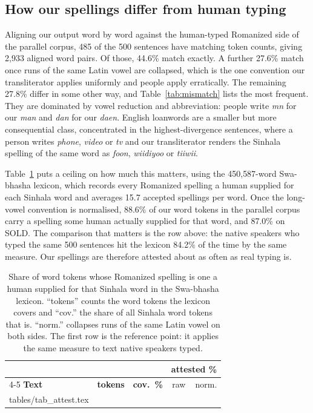 \documentclass[11pt]{article}
\makeatletter
\newcommand{\rom}[1]{\textit{#1}}                 %
\newcommand{\rows}[1]{\@@input #1 }
\makeatother
\begin{document}
\subsection{How our spellings differ from human typing}

Aligning our output word by word against the human-typed Romanized side of the
parallel corpus, 485 of the 500 sentences have matching token counts, giving
2{,}933 aligned word pairs. Of those, 44.6\% match exactly. A further 27.6\% match
once runs of the same Latin vowel are collapsed, which is the one convention our
transliterator applies uniformly and people apply erratically. The remaining
27.8\% differ in some other way, and Table~\ref{tab:mismatch} lists the most
frequent. They are dominated by vowel reduction and abbreviation: people write
\rom{mn} for our \rom{man} and \rom{dan} for our \rom{daen}. English loanwords are
a smaller but more consequential class, concentrated in the highest-divergence
sentences, where a person writes \rom{phone}, \rom{video} or \rom{tv} and our
transliterator renders the Sinhala spelling of the same word as \rom{foon},
\rom{wiidiyoo} or \rom{tiiwii}.

Table~\ref{tab:attest} puts a ceiling on how much this matters, using the
450{,}587-word Swa-bhasha lexicon, which records every Romanized spelling a human
supplied for each Sinhala word and averages 15.7 accepted spellings per word.
Once the long-vowel convention is normalised, 88.6\% of our word tokens in the
parallel corpus carry a spelling some human actually supplied for that word, and
87.0\% on SOLD. The comparison that matters is the row above: the native speakers
who typed the same 500 sentences hit the lexicon 84.2\% of the time by the same
measure. Our spellings are therefore attested about as often as real typing is.

\begin{table}[t]
\centering\footnotesize
\setlength{\tabcolsep}{2.4pt}
\begin{tabular}{@{}lrrrr@{}}
\toprule
& & & \multicolumn{2}{c}{\textbf{attested \%}} \\
\cmidrule(lr){4-5}
\textbf{Text} & \textbf{tokens} & \textbf{cov.\ \%} & raw & norm. \\
\midrule
\rows{tables/tab_attest.tex}
\bottomrule
\end{tabular}
\caption{Share of word tokens whose Romanized spelling is one a human supplied
for that Sinhala word in the Swa-bhasha lexicon. ``tokens'' counts the word
tokens the lexicon covers and ``cov.'' the share of all Sinhala word tokens that
is. ``norm.'' collapses runs of the same Latin vowel on both sides. The first row
is the reference point: it applies the same measure to text native speakers
typed.}
\label{tab:attest}
\end{table}
\end{document}
